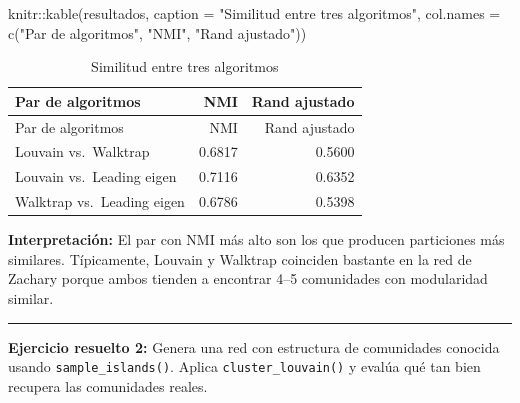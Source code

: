 \documentclass[
  letterpaper,
  DIV=11,
  numbers=noendperiod]{scrreprt}
\newenvironment{Shaded}{\begin{snugshade}}{\end{snugshade}}
\newcommand{\AttributeTok}[1]{\textcolor[rgb]{0.40,0.45,0.13}{#1}}
\newcommand{\FunctionTok}[1]{\textcolor[rgb]{0.28,0.35,0.67}{#1}}
\newcommand{\NormalTok}[1]{\textcolor[rgb]{0.00,0.23,0.31}{#1}}
\newcommand{\SpecialCharTok}[1]{\textcolor[rgb]{0.37,0.37,0.37}{#1}}
\newcommand{\StringTok}[1]{\textcolor[rgb]{0.13,0.47,0.30}{#1}}
\begin{document}
\begin{tcolorbox}
\begin{Shaded}
\begin{Highlighting}[]
\NormalTok{knitr}\SpecialCharTok{::}\FunctionTok{kable}\NormalTok{(resultados,}
             \AttributeTok{caption =} \StringTok{"Similitud entre tres algoritmos"}\NormalTok{,}
             \AttributeTok{col.names =} \FunctionTok{c}\NormalTok{(}\StringTok{"Par de algoritmos"}\NormalTok{, }\StringTok{"NMI"}\NormalTok{, }\StringTok{"Rand ajustado"}\NormalTok{))}
\end{Highlighting}
\end{Shaded}

\begin{longtable}[]{@{}lrr@{}}
\caption{Similitud entre tres algoritmos}\tabularnewline
\toprule\noalign{}
Par de algoritmos & NMI & Rand ajustado \\
\midrule\noalign{}
\endfirsthead
\toprule\noalign{}
Par de algoritmos & NMI & Rand ajustado \\
\midrule\noalign{}
\endhead
\bottomrule\noalign{}
\endlastfoot
Louvain vs.~Walktrap & 0.6817 & 0.5600 \\
Louvain vs.~Leading eigen & 0.7116 & 0.6352 \\
Walktrap vs.~Leading eigen & 0.6786 & 0.5398 \\
\end{longtable}

\textbf{Interpretación:} El par con NMI más alto son los que producen
particiones más similares. Típicamente, Louvain y Walktrap coinciden
bastante en la red de Zachary porque ambos tienden a encontrar 4--5
comunidades con modularidad similar.

\end{tcolorbox}

\begin{center}\rule{0.5\linewidth}{0.5pt}\end{center}

\textbf{Ejercicio resuelto 2:} Genera una red con estructura de
comunidades conocida usando \texttt{sample\_islands()}. Aplica
\texttt{cluster\_louvain()} y evalúa qué tan bien recupera las
comunidades reales.
\end{document}
